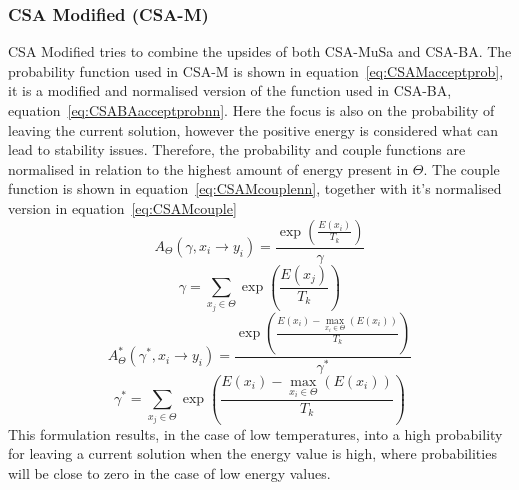 \subsubsection{CSA Modified (CSA-M)}
CSA Modified tries to combine the upsides of both CSA-MuSa and CSA-BA. 
The probability function used in CSA-M is shown in equation~\ref{eq:CSAMacceptprob}, it is a modified and normalised version of the function used in CSA-BA, equation~\ref{eq:CSABAacceptprobnn}.
Here the focus is also on the probability of leaving the current solution, however the positive energy is considered what can lead to stability issues.
Therefore, the probability and couple functions are normalised in relation to the highest amount of energy present in $\Theta$.
The couple function is shown in equation~\ref{eq:CSAMcouplenn}, together with it's normalised version in equation~\ref{eq:CSAMcouple}
\begin{equation}
	A_\Theta(\gamma,x_i \rightarrow y_i)= \frac{\exp(\frac{E(x_i)}{T_k})}{\gamma}
	\label{eq:CSABAacceptprobnn}
\end{equation}
\begin{equation}
	\gamma = \sum_{x_j \in \Theta}^{}\exp(\frac{E(x_j)}{T_k})
	\label{eq:CSAMcouplenn}
\end{equation}
\begin{equation}
	A_\Theta^*(\gamma^*,x_i \rightarrow y_i)=\frac{\exp \left( \frac{E(x_i)-\max\limits_{x_i \in \Theta}(E(x_i) ) }{T_k} \right)   }{\gamma^*}
	\label{eq:CSAMacceptprob}
\end{equation}
\begin{equation}
	\gamma^* = \sum_{x_j \in \Theta}^{} \exp \left( \frac{E(x_i)-\max\limits_{x_i \in \Theta}(E(x_i) ) }{T_k} \right)   
	\label{eq:CSAMcouple}
\end{equation}
This formulation results, in the case of low temperatures, into a high probability for leaving a current solution when the energy value is high, where probabilities will be close to zero in the case of low energy values.
